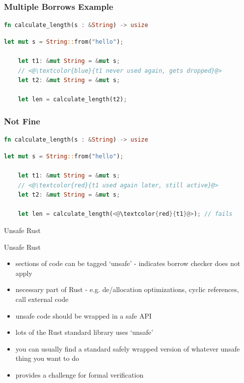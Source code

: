 \documentclass{beamer}
\begin{document}
\begin{frame}[fragile]
\frametitle{Multiple Borrows Example}
\begin{lstlisting}[language=Rust]
fn calculate_length(s : &String) -> usize
\end{lstlisting}

\begin{block}{}
\begin{lstlisting}[language=Rust]
    let mut s = String::from("hello");
    
    let t1: &mut String = &mut s;
    // <@\textcolor{blue}{t1 never used again, gets dropped}@>
    let t2: &mut String = &mut s;

    let len = calculate_length(t2);
 \end{lstlisting}
\end{block}

\end{frame}


\begin{frame}[fragile]
\frametitle{Not Fine}
\begin{lstlisting}[language=Rust]
fn calculate_length(s : &String) -> usize
\end{lstlisting}

\begin{block}{}
\begin{lstlisting}[language=Rust]
    let mut s = String::from("hello");
    
    let t1: &mut String = &mut s;
    // <@\textcolor{red}{t1 used again later, still active}@>
    let t2: &mut String = &mut s;

    let len = calculate_length(<@\textcolor{red}{t1}@>); // fails
 \end{lstlisting}
\end{block}

\end{frame}




\begin{frame}{Unsafe Rust}
\begin{block}{Unsafe Rust}
\begin{itemize} 
	\item sections of code can be tagged `unsafe' - indicates borrow checker does not apply
	\item necessary part of Rust - e.g. de/allocation optimizations, cyclic references, call external code
	\item unsafe code should be wrapped in a safe API
	\item lots of the Rust standard library uses `unsafe'
	\item you can usually find a standard safely wrapped version of whatever unsafe thing you want to do
	\item provides a challenge for formal verification
\end{itemize} 
\end{block}
\end{frame}
\end{document}

